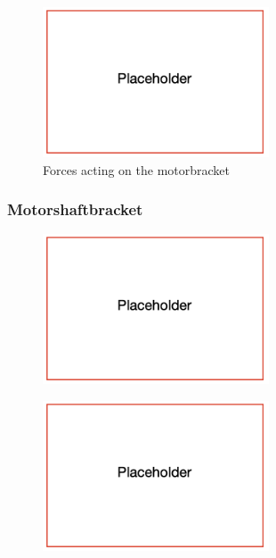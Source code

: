\begin{figure}[H]
\centering
\includegraphics[width=0.6\textwidth]{texfiles/mech/eimg/propulsion/placeholder}
\caption{Forces acting on the motorbracket}
\label{fig:motorbracket_forces}
\end{figure}

\subsubsection{Motorshaftbracket}
\begin{figure}[H]
\centering
\includegraphics[width=0.6\textwidth]{texfiles/mech/eimg/propulsion/placeholder}
\caption{}
\label{}
\end{figure}

\begin{figure}[H]
\centering
\includegraphics[width=0.6\textwidth]{texfiles/mech/eimg/propulsion/placeholder}
\caption{}
\label{}
\end{figure}

